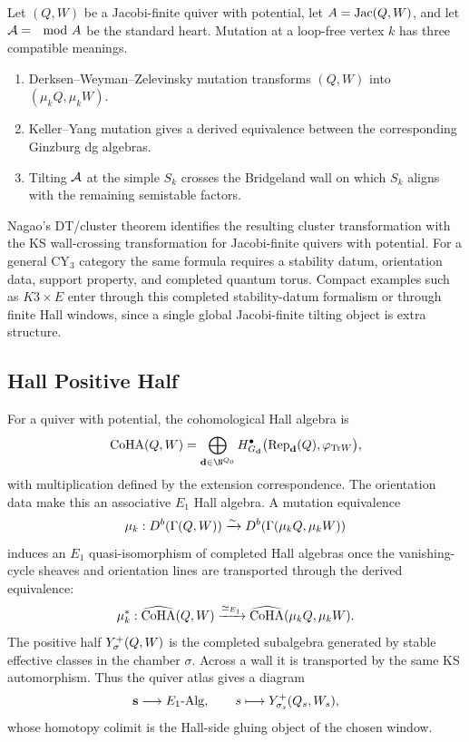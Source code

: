 Let $(Q,W)$ be a Jacobi-finite quiver with potential, let
$A=\mathrm{Jac}(Q,W)$, and let $\mathcal{A}=\mod A$ be the standard heart. Mutation at a
loop-free vertex $k$ has three compatible meanings.

\begin{enumerate}\itemsep2pt
  \item Derksen--Weyman--Zelevinsky mutation transforms $(Q,W)$ into
  $(\mu_kQ,\mu_kW)$.
  \item Keller--Yang mutation gives a derived equivalence between the
  corresponding Ginzburg dg algebras.
  \item Tilting $\mathcal{A}$ at the simple $S_k$ crosses the Bridgeland wall
  on which $S_k$ aligns with the remaining semistable factors.
\end{enumerate}

Nagao's DT/cluster theorem identifies the resulting cluster
transformation with the KS wall-crossing transformation for
Jacobi-finite quivers with potential. For a general CY$_3$ category the
same formula requires a stability datum, orientation data, support
property, and completed quantum torus. Compact examples such as
$K3\times E$ enter through this completed stability-datum formalism or
through finite Hall windows, since a single global Jacobi-finite tilting
object is extra structure.

\subsection*{Hall Positive Half}
\label{sec:hall-positive-half}

For a quiver with potential, the cohomological Hall algebra is
\[
  \CoHA(Q,W)
  =
  \bigoplus_{\mathbf d\in\N^{Q_0}}
  H^{\bullet}_{G_{\mathbf d}}
  \bigl(\Rep_{\mathbf d}(Q),\varphi_{\Tr W}\bigr),
\]
with multiplication defined by the extension correspondence. The
orientation data make this an associative $E_{1}$ Hall algebra. A
mutation equivalence
\[
  \mu_k:D^{b}(\Gamma(Q,W))\xrightarrow{\sim}
        D^{b}(\Gamma(\mu_kQ,\mu_kW))
\]
induces an $E_{1}$ quasi-isomorphism of completed Hall algebras once the
vanishing-cycle sheaves and orientation lines are transported through
the derived equivalence:
\[
  \mu_k^*:
  \widehat{\mathrm{CoHA}}(Q,W)
  \xrightarrow{\simeq_{E_{1}}}
  \widehat{\mathrm{CoHA}}(\mu_kQ,\mu_kW).
\]
The positive half $Y^{+}_{\sigma}(Q,W)$ is the completed subalgebra
generated by stable effective classes in the chamber $\sigma$. Across a
wall it is transported by the same KS automorphism. Thus the quiver
atlas gives a diagram
\[
  \mathbf{s}\longrightarrow E_{1}\text{-}\mathrm{Alg},
  \qquad
  s\longmapsto Y^{+}_{\sigma_s}(Q_s,W_s),
\]
whose homotopy colimit is the Hall-side gluing object of the chosen
window.

